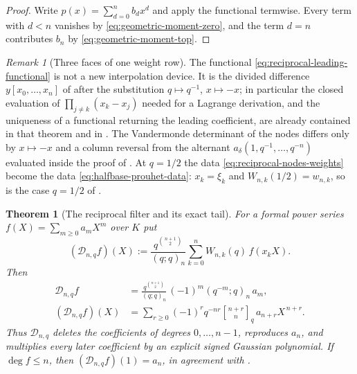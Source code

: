 \documentclass[11pt,oneside,openany]{book}
\newtheorem{theorem}{Theorem}[chapter]
\theoremstyle{definition}
\theoremstyle{remark}
\newtheorem{remark}[remark]{Remark}
\newcommand{\Qbinom}[3]{\genfrac{[}{]}{0pt}{}{#1}{#2}_{#3}}
\newcommand{\defeq}{\mathrel{:=}}
\begin{document}
\begin{proof}
Write $p(x)=\sum_{d=0}^{n}b_dx^d$ and apply the functional termwise.  Every term with $d<n$ vanishes by \eqref{eq:geometric-moment-zero}, and the term $d=n$ contributes $b_n$ by \eqref{eq:geometric-moment-top}.
\end{proof}

\begin{remark}[Three faces of one weight row]\label{rem:reciprocal-weight-faces}
The functional \eqref{eq:reciprocal-leading-functional} is not a new interpolation device.  It is the divided difference $y[x_0,\ldots,x_n]$ of  after the substitution $q\mapsto q^{-1}$, $x\mapsto-x$; in particular the closed evaluation of $\prod_{j\ne k}(x_k-x_j)$ needed for a Lagrange derivation, and the uniqueness of a functional returning the leading coefficient, are already contained in that theorem and in .  The Vandermonde determinant of the nodes differs only by $x\mapsto-x$ and a column reversal from the alternant $a_\delta(1,q^{-1},\ldots,q^{-n})$ evaluated inside the proof of .  At $q=1/2$ the data \eqref{eq:reciprocal-nodes-weights} become the data \eqref{eq:halfbase-prouhet-data}: $x_k=\xi_k$ and $W_{n,k}(1/2)=w_{n,k}$, so  is the case $q=1/2$ of .
\end{remark}

\begin{theorem}[The reciprocal filter and its exact tail]\label{thm:reciprocal-exact-tail}
For a formal power series $f(X)=\sum_{m\ge0}a_mX^m$ over $K$ put
\begin{equation}\label{eq:reciprocal-filter-definition}
 (\mathcal D_{n,q}f)(X)
 \defeq\frac{q^{\binom{n+1}{2}}}{(q;q)_n}
   \sum_{k=0}^{n}W_{n,k}(q)\,f(x_kX).
\end{equation}
Then
\begin{align}
 [X^m]\mathcal D_{n,q}f
 &=\frac{q^{\binom{n+1}{2}}}{(q;q)_n}\,(-1)^m(q^{-m};q)_n\,a_m,
 \label{eq:reciprocal-filter-diagonal}\\
 (\mathcal D_{n,q}f)(X)
 &=\sum_{r\ge0}(-1)^rq^{-nr}\Qbinom{n+r}{n}{q}\,a_{n+r}X^{\,n+r}.
 \label{eq:reciprocal-filter-tail}
\end{align}
Thus $\mathcal D_{n,q}$ deletes the coefficients of degrees $0,\ldots,n-1$, reproduces $a_n$, and multiplies every later coefficient by an explicit signed Gaussian polynomial.  If $\deg f\le n$, then $(\mathcal D_{n,q}f)(1)=a_n$, in agreement with .
\end{theorem}
\end{document}
